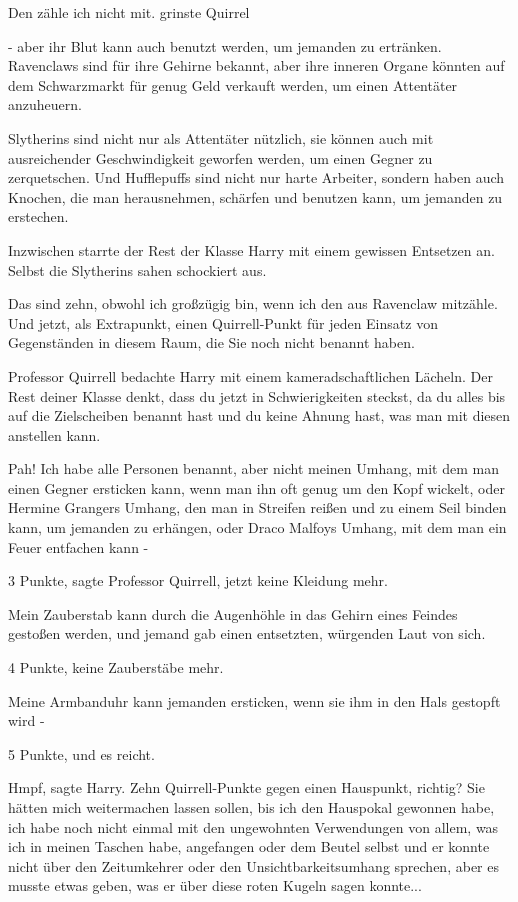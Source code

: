 \glqq{}Den zähle ich nicht mit.\grqq{} grinste Quirrel

\glqq{}- aber ihr Blut kann auch benutzt werden, um jemanden zu ertränken.
Ravenclaws sind für ihre Gehirne bekannt, aber ihre inneren Organe könnten auf
dem Schwarzmarkt für genug Geld verkauft werden, um einen Attentäter anzuheuern.

Slytherins sind nicht nur als Attentäter nützlich, sie können auch mit
ausreichender Geschwindigkeit geworfen werden, um einen Gegner zu zerquetschen.
Und Hufflepuffs sind nicht nur harte Arbeiter, sondern haben auch Knochen, die
man herausnehmen, schärfen und benutzen kann, um jemanden zu erstechen.\grqq{}

Inzwischen starrte der Rest der Klasse Harry mit einem gewissen Entsetzen an.
Selbst die Slytherins sahen schockiert aus.

\glqq{}Das sind zehn, obwohl ich großzügig bin, wenn ich den aus Ravenclaw
mitzähle. Und jetzt, als Extrapunkt, einen Quirrell-Punkt für jeden Einsatz von
Gegenständen in diesem Raum, die Sie noch nicht benannt haben.\grqq{}

Professor Quirrell bedachte Harry mit einem kameradschaftlichen Lächeln. \glqq{}
Der Rest deiner Klasse denkt, dass du jetzt in Schwierigkeiten steckst, da du
alles bis auf die Zielscheiben benannt hast und du keine Ahnung hast, was man
mit diesen anstellen kann.\grqq{}

\glqq{}Pah! Ich habe alle Personen benannt, aber nicht meinen Umhang, mit dem man
einen Gegner ersticken kann, wenn man ihn oft genug um den Kopf wickelt, oder
Hermine Grangers Umhang, den man in Streifen reißen und zu einem Seil binden
kann, um jemanden zu erhängen, oder Draco Malfoys Umhang, mit dem man ein Feuer
entfachen kann -\grqq{}

\glqq{}3 Punkte\grqq{}, sagte Professor Quirrell, \glqq{}jetzt keine Kleidung
mehr.\grqq{}

\glqq{}Mein Zauberstab kann durch die Augenhöhle in das Gehirn eines Feindes
gestoßen werden\grqq{}, und jemand gab einen entsetzten, würgenden Laut von
sich.

\glqq{}4 Punkte, keine Zauberstäbe mehr.\grqq{}

\glqq{}Meine Armbanduhr kann jemanden ersticken, wenn sie ihm in den Hals
gestopft wird -\grqq{}

\glqq{}5 Punkte, und es reicht.\grqq{}

\glqq{}Hmpf\grqq{}, sagte Harry. \glqq{}Zehn Quirrell-Punkte gegen einen
Hauspunkt, richtig? Sie hätten mich weitermachen lassen sollen, bis ich den
Hauspokal gewonnen habe, ich habe noch nicht einmal mit den ungewohnten
Verwendungen von allem, was ich in meinen Taschen habe, angefangen\grqq{} oder
dem Beutel selbst und er konnte nicht über den Zeitumkehrer oder den
Unsichtbarkeitsumhang sprechen, aber es musste etwas geben, was er über diese
roten Kugeln sagen konnte...

